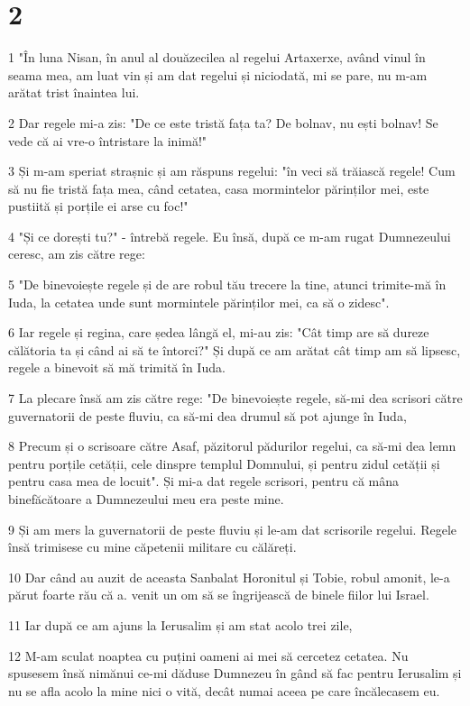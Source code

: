 \chapter{2}

\par 1 "În luna Nisan, în anul al douăzecilea al regelui Artaxerxe, având vinul în seama mea, am luat vin și am dat regelui și niciodată, mi se pare, nu m-am arătat trist înaintea lui.
\par 2 Dar regele mi-a zis: "De ce este tristă fața ta? De bolnav, nu ești bolnav! Se vede că ai vre-o întristare la inimă!"
\par 3 Și m-am speriat strașnic și am răspuns regelui: "în veci să trăiască regele! Cum să nu fie tristă fața mea, când cetatea, casa mormintelor părinților mei, este pustiită și porțile ei arse cu foc!"
\par 4 "Și ce dorești tu?" - întrebă regele. Eu însă, după ce m-am rugat Dumnezeului ceresc, am zis către rege:
\par 5 "De binevoiește regele și de are robul tău trecere la tine, atunci trimite-mă în Iuda, la cetatea unde sunt mormintele părinților mei, ca să o zidesc".
\par 6 Iar regele și regina, care ședea lângă el, mi-au zis: "Cât timp are să dureze călătoria ta și când ai să te întorci?" Și după ce am arătat cât timp am să lipsesc, regele a binevoit să mă trimită în Iuda.
\par 7 La plecare însă am zis către rege: "De binevoiește regele, să-mi dea scrisori către guvernatorii de peste fluviu, ca să-mi dea drumul să pot ajunge în Iuda,
\par 8 Precum și o scrisoare către Asaf, păzitorul pădurilor regelui, ca să-mi dea lemn pentru porțile cetății, cele dinspre templul Domnului, și pentru zidul cetății și pentru casa mea de locuit". Și mi-a dat regele scrisori, pentru că mâna binefăcătoare a Dumnezeului meu era peste mine.
\par 9 Și am mers la guvernatorii de peste fluviu și le-am dat scrisorile regelui. Regele însă trimisese cu mine căpetenii militare cu călăreți.
\par 10 Dar când au auzit de aceasta Sanbalat Horonitul și Tobie, robul amonit, le-a părut foarte rău că a. venit un om să se îngrijească de binele fiilor lui Israel.
\par 11 Iar după ce am ajuns la Ierusalim și am stat acolo trei zile,
\par 12 M-am sculat noaptea cu puțini oameni ai mei să cercetez cetatea. Nu spusesem însă nimănui ce-mi dăduse Dumnezeu în gând să fac pentru Ierusalim și nu se afla acolo la mine nici o vită, decât numai aceea pe care încălecasem eu.
